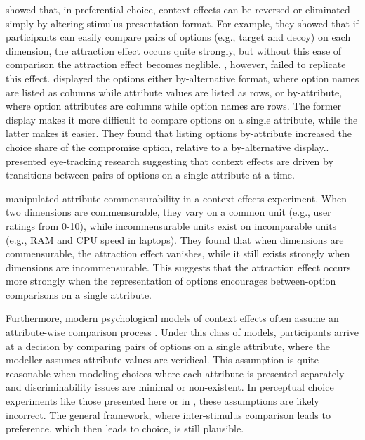 \textcite{cataldoComparisonProcessAccount2019b} showed that, in preferential choice, context effects can be reversed or eliminated simply by altering stimulus presentation format. For example, they showed that if participants can easily compare pairs of options (e.g., target and decoy) on each dimension, the attraction effect occurs quite strongly, but without this ease of comparison the attraction effect becomes neglible. \textcite{hasan2025registered}, however, failed to replicate this effect. \textcite{changWhichCompromiseOption2008} displayed the options either by-alternative format, where option names are listed as columns while attribute values are listed as rows, or by-attribute, where option attributes are columns while option names are rows. The former display makes it more difficult to compare options on a single attribute, while the latter makes it easier. They found that listing options by-attribute increased the choice share of the compromise option, relative to a by-alternative display.. \textcite{noguchi2014attraction} presented eye-tracking research suggesting that context effects are driven by transitions between pairs of options on a single attribute at a time. 

\textcite{hayes2024attribute} manipulated attribute commensurability in a context effects experiment. When two dimensions are commensurable, they vary on a common unit (e.g., user ratings from 0-10), while incommensurable units exist on incomparable units (e.g., RAM and CPU speed in laptops). They found that when dimensions are commensurable, the attraction effect vanishes, while it still exists strongly when dimensions are incommensurable. This suggests that the attraction effect occurs more strongly when the representation of options encourages between-option comparisons on a single attribute.

Furthermore, modern psychological models of context effects often assume an attribute-wise comparison process \parencite{roeMultialternativeDecisionField2001a,trueblood2013not,usherLossAversionInhibition2004a,bhatiaAssociationsAccumulationPreference2013b}. Under this class of models, participants arrive at a decision by comparing pairs of options on a single attribute, where the modeller assumes attribute values are veridical. This assumption is quite reasonable when modeling choices where each attribute is presented separately and discriminability issues are minimal or non-existent. In perceptual choice experiments like those presented here or in \textcite{spektorWhenGoodLooks2018b,trueblood2013not}, these assumptions are likely incorrect. The general framework, where inter-stimulus comparison leads to preference, which then leads to choice, is still plausible.

